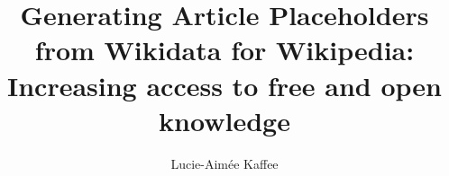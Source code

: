 \documentclass[11pt]{article}
\title {{Generating Article Placeholders from Wikidata for Wikipedia: Increasing access to free and open knowledge}}
\author {Lucie-Aim\'{e}e Kaffee}
\date{}
\begin{document}
\linenumbers




\newpage

\newpage

\end{document}
